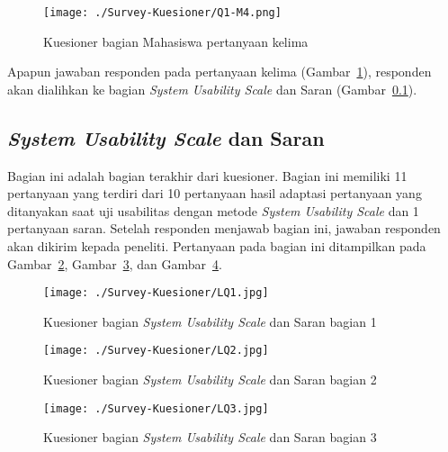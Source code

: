 \begin{figure}[H]
	\centering  
	\texttt{[image: ./Survey-Kuesioner/Q1-M4.png]}  
	\caption[Kuesioner bagian Mahasiswa pertanyaan kelima]{Kuesioner bagian Mahasiswa pertanyaan kelima} 
	\label{fig:q1-m4} 
\end{figure}

Apapun jawaban responden pada pertanyaan kelima (Gambar~\ref{fig:q1-m4}), responden akan dialihkan ke bagian \textit{System Usability Scale} dan Saran (Gambar~\ref{subsec:final}).

\subsection{\textit{System Usability Scale} dan Saran}
\label{subsec:final}

Bagian ini adalah bagian terakhir dari kuesioner. Bagian ini memiliki 11 pertanyaan yang terdiri dari 10 pertanyaan hasil adaptasi pertanyaan yang ditanyakan saat uji usabilitas dengan metode \textit{System Usability Scale} dan 1 pertanyaan saran. Setelah responden menjawab bagian ini, jawaban responden akan dikirim kepada peneliti. Pertanyaan pada bagian ini ditampilkan pada Gambar~\ref{fig:lq1}, Gambar~\ref{fig:lq2}, dan Gambar~\ref{fig:lq3}.

\begin{figure}[H]
	\centering  
	\texttt{[image: ./Survey-Kuesioner/LQ1.jpg]} 
	\caption[Kuesioner bagian \textit{System Usability Scale} dan Saran bagian 1]{Kuesioner bagian \textit{System Usability Scale} dan Saran bagian 1} 
	\label{fig:lq1} 
\end{figure}

\begin{figure}[H]
	\centering  
	\texttt{[image: ./Survey-Kuesioner/LQ2.jpg]}  
	\caption[Kuesioner bagian \textit{System Usability Scale} dan Saran bagian 2]{Kuesioner bagian \textit{System Usability Scale} dan Saran bagian 2} 
	\label{fig:lq2} 
\end{figure}

\begin{figure}[H]
	\centering  
	\texttt{[image: ./Survey-Kuesioner/LQ3.jpg]}  
	\caption[Kuesioner bagian \textit{System Usability Scale} dan Saran bagian 3]{Kuesioner bagian \textit{System Usability Scale} dan Saran bagian 3} 
	\label{fig:lq3} 
\end{figure}

